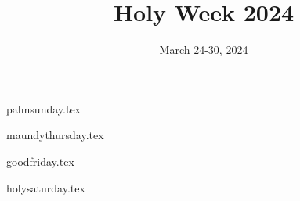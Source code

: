 \documentclass[letterpaper]{report}
\title{Holy Week 2024}
\date{March 24-30, 2024}
\begin{document}
\maketitle

{palmsunday.tex}

{maundythursday.tex}

{goodfriday.tex}

{holysaturday.tex}

\printbibliography
\end{document}

